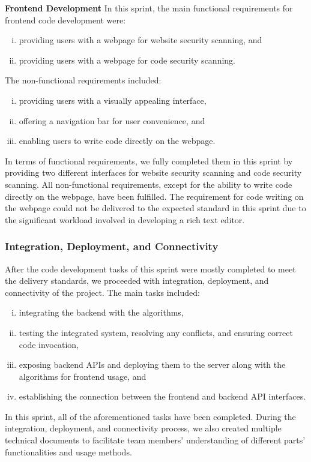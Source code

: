 \documentclass[journal]{IEEEtran}
\begin{document}
\textbf{Frontend Development}
In this sprint, the main functional requirements for frontend code development were: 
\begin{enumerate}[(i)]
  \item providing users with a webpage for website security scanning, and 
  \item providing users with a webpage for code security scanning. 
\end{enumerate}
The non-functional requirements included: 
\begin{enumerate}[(i)]
\item providing users with a visually appealing interface, 
\item offering a navigation bar for user convenience, and 
\item enabling users to write code directly on the webpage. 
\end{enumerate}
In terms of functional requirements, we fully completed them in this sprint by providing two different interfaces for website security scanning and code security scanning. All non-functional requirements, except for the ability to write code directly on the webpage, have been fulfilled. The requirement for code writing on the webpage could not be delivered to the expected standard in this sprint due to the significant workload involved in developing a rich text editor.

\subsubsection{Integration, Deployment, and Connectivity}
After the code development tasks of this sprint were mostly completed to meet the delivery standards, we proceeded with integration, deployment, and connectivity of the project. The main tasks included: 
\begin{enumerate}[(i)]
  \item integrating the backend with the algorithms, 
  \item testing the integrated system, resolving any conflicts, and ensuring correct code invocation, 
  \item exposing backend APIs and deploying them to the server along with the algorithms for frontend usage, and 
  \item establishing the connection between the frontend and backend API interfaces.
\end{enumerate}
In this sprint, all of the aforementioned tasks have been completed. During the integration, deployment, and connectivity process, we also created multiple technical documents to facilitate team members' understanding of different parts' functionalities and usage methods.
\end{document}
